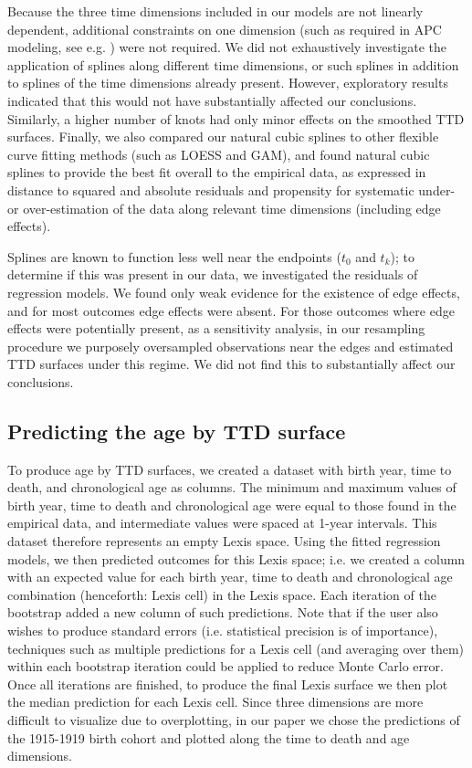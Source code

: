 \documentclass[11pt,oneside,a4paper]{article} %
\begin{document}
\begin{appendices}
Because the three time dimensions included in our models are not linearly dependent, additional constraints on one dimension (such as required in APC modeling, see e.g. \citet{clayton1987models}) were not required. We did not exhaustively investigate the application of splines along different time dimensions, or such splines in addition to splines of the time dimensions already present. However, exploratory results indicated that this would not have substantially affected our conclusions. Similarly, a higher number of knots had only minor effects on the smoothed TTD surfaces. Finally, we also compared our natural cubic splines to other flexible curve fitting methods (such as LOESS and GAM), and found natural cubic splines to provide the best fit overall to the empirical data, as expressed in distance to squared and absolute residuals and propensity for systematic under- or over-estimation of the data along relevant time dimensions (including edge effects).

Splines are known to function less well near the endpoints ($t_0$ and $t_k$); to determine if this was present in our data, we investigated the residuals of regression models. We found only weak evidence for the existence of edge effects, and for most outcomes edge effects were absent. For those outcomes where edge effects were potentially present, as a sensitivity analysis, in our resampling procedure we purposely oversampled observations near the edges and estimated TTD surfaces under this regime. We did not find this to substantially affect our conclusions. 

\subsection{Predicting the age by TTD surface}
To produce age by TTD surfaces, we created a dataset with birth year, time to death, and chronological age as columns. The minimum and maximum values of birth year, time to death and chronological age were equal to those found in the empirical data, and intermediate values were spaced at 1-year intervals. This dataset therefore represents an empty Lexis space. Using the fitted regression models, we then predicted outcomes for this Lexis space; i.e. we created a column with an expected value for each birth year, time to death and chronological age combination (henceforth: Lexis cell) in the Lexis space. Each iteration of the bootstrap added a new column of such predictions. Note that if the user also wishes to produce standard errors (i.e. statistical precision is of importance), techniques such as multiple predictions for a Lexis cell (and averaging over them) within each bootstrap iteration could be applied to reduce Monte Carlo error. Once all iterations are finished, to produce the final Lexis surface we then plot the median prediction for each Lexis cell. Since three dimensions are more difficult to visualize due to overplotting, in our paper we chose the predictions of the 1915-1919 birth cohort and plotted along the time to death and age dimensions. 


\end{appendices}
\end{document}
